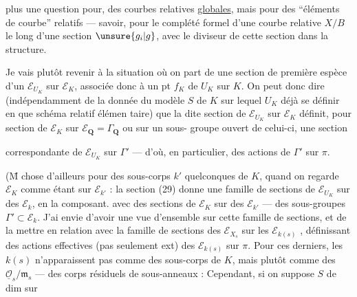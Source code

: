 plus une question pour, des courbes relatives
\uline{globales}, mais pour des ``éléments de
courbe'' relatifs --- savoir, pour le
complété formel d'une courbe relative
$X/B$ le long d'une section $\unsure{g_i|g}$,
avec le diviseur de cette section  %
dans la structure.

Je vais plutôt revenir à la situation
où on part de une section de première
espèce d'un $\mathcal E_{U_K}$ sur $\mathcal E_K$, associée
donc à un pt  $f_K$ de $U_K$ sur $K$.
On peut donc dire (indépendamment de
la donnée du modèle $S$ de $K$ sur
lequel $U_K$  déjà se définir
en  que schéma relatif élémen%
taire) que la dite section de
$\mathcal E_{U_K}$ sur $\mathcal E_K$  définit, pour  section
de $\mathcal E_K$ sur $\mathcal E_{\mathbf Q}=\Gamma_{\mathbf Q}$ ou sur un sous-%
groupe ouvert  de celui-ci, une section

correspondante de $\mathcal E_{U_K}$ sur $\Gamma'$ --- d'où, en particulier, des actions de $\Gamma'$ sur $\pi$.

(\={M} chose d'ailleurs pour des sous-corps $k'$ quelconques de $K$, quand on regarde $\mathcal E_K$ comme étant sur $\mathcal E_{k'}$ : la section (29) donne une famille de sections de $\mathcal E_{U_K}$ sur des $\mathcal E_k$,  en la composant. avec des sections de $\mathcal E_K$ sur des $\mathcal E_{k'}$ --- des sous-groupes $\Gamma'\subset\mathcal E_k$. J'ai envie d'avoir une vue d'ensemble sur cette famille de sections, et de la mettre en relation avec la famille de sections des $\mathcal E_{X_s}$ sur les $\mathcal E_{k(s)}$ , définissant des actions effectives (pas seulement ext) des $\mathcal E_{k(s)}$ sur $\pi$. Pour ces derniers, les $k(s)$ n'apparaissent pas comme des sous-corps de $K$, mais plutôt comme des $\underline{\mathcal O}_s/\mathfrak m_s$ --- des corps résiduels de sous-anneaux : Cependant, si on suppose $S$ de dim   sur


